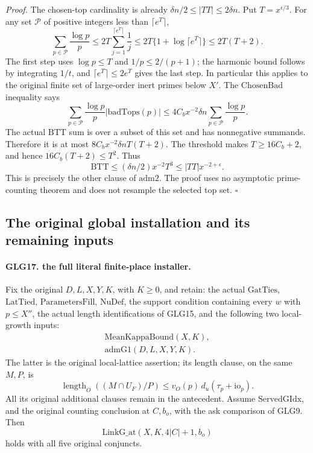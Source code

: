 \emph{Proof.}
The chosen-top cardinality is already
\(\delta n/2\le|TT|\le2\delta n\).
Put \(T=x^{\epsilon/3}\). For any set \(\mathcal P\)
of positive integers less than \(\lceil e^T\rceil\),
\[
 \sum_{p\in\mathcal P}\frac{\log p}{p}
 \le2T\sum_{j=1}^{\lceil e^T\rceil}\frac1j
 \le2T\{1+\log\lceil e^T\rceil\}\le2T(T+2).                       \tag{GLG.46}
\]
The first step uses \(\log p\le T\) and
\(1/p\le2/(p+1)\); the harmonic bound follows by
integrating \(1/t\), and
\(\lceil e^T\rceil\le2e^T\) gives the last step.
In particular this applies to the original finite set
of large-order inert primes below \(X'\).
The \(\mathrm{ChosenBad}\) inequality says
\[
 \sum_{p\in\mathcal P}\frac{\log p}{p}
                       |\mathrm{badTops}(p)|
    \le4C_bx^{-2}\delta n
                    \sum_{p\in\mathcal P}\frac{\log p}{p}.
 \]
The actual \(\mathrm{BTT}\) sum is over a subset of
this set and has nonnegative summands. Therefore it is
at most \(8C_bx^{-2}\delta nT(T+2)\).
The threshold makes \(T\ge16C_b+2\), and hence
\(16C_b(T+2)\le T^2\). Thus
\[
 \mathrm{BTT}\le(\delta n/2)x^{-2}T^3
                      \le |TT|x^{-2+\epsilon}.
 \]
This is precisely the other clause of \(\mathrm{adm2}\).
The proof uses no asymptotic prime-counting theorem and
does not resample the selected top set.
\hfill\(\square\)

\subsection{The original global installation and its remaining inputs}

\paragraph{GLG17. the full literal finite-place installer.}
\label{claim:GLG17}
Fix the original \(D,L,X,Y,K\), with \(K\ge0\), and retain:
the actual \(\mathrm{GatTies}\), \(\mathrm{LatTied}\),
\(\mathrm{ParametersFill}\), \(\mathrm{NuDef}\),
the support condition containing every \(w\) with \(p\le X''\),
the actual length identifications of GLG15, and the following
two local-growth inputs:
\[
 \begin{gathered}
 \mathrm{MeanKappaBound}(X,K),\\
 \mathrm{admG1}(D,L,X,Y,K).
 \end{gathered}                                                     \tag{GLG.47}
\]
The latter is the original local-lattice assertion; its
length clause, on the same \(M,P\), is
\[
 \operatorname{length}_O((M\cap U_F)/P)
       \le v_O(p)\,d_u(\tau_p+\mathrm{io}_p).                     \tag{GLG.48}
\]
All its original additional clauses remain in the antecedent.
Assume \(\mathrm{ServedGIdx}\), and the original counting
conclusion at \(C,b_o\), with the ask comparison of GLG9.
Then
\[
                    \mathrm{LinkG\_at}(X,K,4|C|+1,b_o)           \tag{GLG.49}
\]
holds with all five original conjuncts.

